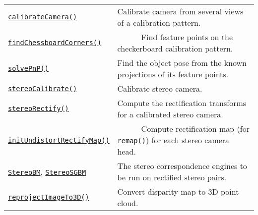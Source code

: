 \documentclass[10pt,landscape]{article}
\begin{document}
\begin{multicols}{3}
\begin{tabular}{@{}p{\the\MyLen}%
                @{}p{\linewidth-\the\MyLen}@{}}

\texttt{\href{http://opencv.willowgarage.com/documentation/cpp/camera_calibration_and_3d_reconstruction.html\#cv-calibratecamera}{calibrateCamera()}} & Calibrate camera from several views of a calibration pattern. \\

\texttt{\href{http://opencv.willowgarage.com/documentation/cpp/camera_calibration_and_3d_reconstruction.html\#cv-findchessboardcorners}{findChessboardCorners()}} & \ \ \ \ \ \ Find feature points on the checkerboard calibration pattern. \\

\texttt{\href{http://opencv.willowgarage.com/documentation/cpp/camera_calibration_and_3d_reconstruction.html\#cv-solvepnp}{solvePnP()}} & Find the object pose from the known projections of its feature points. \\

\texttt{\href{http://opencv.willowgarage.com/documentation/cpp/camera_calibration_and_3d_reconstruction.html\#cv-stereocalibrate}{stereoCalibrate()}} & Calibrate stereo camera. \\

\texttt{\href{http://opencv.willowgarage.com/documentation/cpp/camera_calibration_and_3d_reconstruction.html\#cv-stereorectify}{stereoRectify()}} & Compute the rectification transforms for a calibrated stereo camera.\\

\texttt{\href{http://opencv.willowgarage.com/documentation/cpp/camera_calibration_and_3d_reconstruction.html\#cv-initundistortrectifymap}{initUndistortRectifyMap()}} & \ \ \ \ \ \ Compute rectification map (for \texttt{remap()}) for each stereo camera head.\\

\texttt{\href{http://opencv.willowgarage.com/documentation/cpp/camera_calibration_and_3d_reconstruction.html\#cv-StereoBM}{StereoBM}}, \texttt{\href{http://opencv.willowgarage.com/documentation/cpp/camera_calibration_and_3d_reconstruction.html\#cv-StereoSGBM}{StereoSGBM}} & The stereo correspondence engines to be run on rectified stereo pairs.\\

\texttt{\href{http://opencv.willowgarage.com/documentation/cpp/camera_calibration_and_3d_reconstruction.html\#cv-reprojectimageto3d}{reprojectImageTo3D()}} & Convert disparity map to 3D point cloud.\\


\end{tabular}
\end{multicols}
\end{document}

